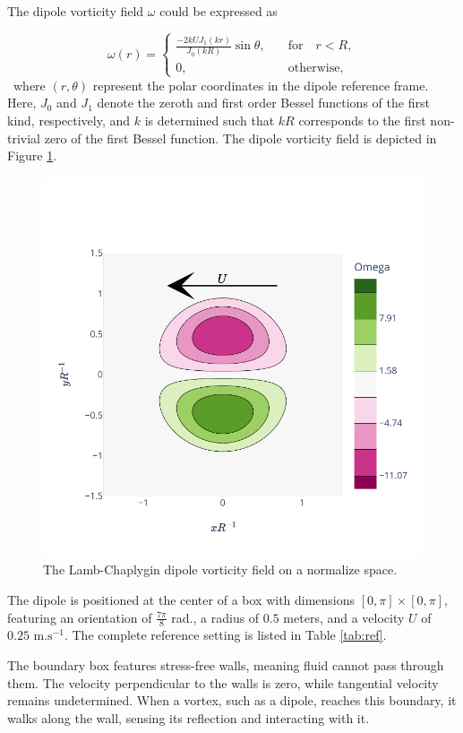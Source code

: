 The dipole vorticity field $\omega$ could be expressed as

\begin{equation*}
	\omega(r) = \begin{cases}
		\frac{-2 k U J_1(kr)}{J_0(kR)} \sin \theta, \quad & \text{for} \quad  r < R, \\
		0, \quad                                          & \text{otherwise},
	\end{cases}
\end{equation*}~where $(r, \theta)$ represent the polar coordinates in the dipole reference frame. Here, $J_0$ and $J_1$ denote the zeroth and first order Bessel functions of the first kind, respectively, and $k$ is determined such that $kR$ corresponds to the first non-trivial zero of the first Bessel function.  The dipole vorticity field is depicted in Figure \ref{fig:lamb_dipole}.

\begin{figure}[ht]
	\centering
	\includegraphics[width=0.6\linewidth]{images/app2d/lamb.pdf}
	\caption{The Lamb-Chaplygin dipole vorticity field on a normalize space.}
	\label{fig:lamb_dipole}
\end{figure}

The dipole is positioned at the center of a box with dimensions $[0, \pi] \times [0, \pi]$, featuring an orientation of $\frac{7\pi}{8}$ rad., a radius of $0.5$ meters, and a velocity $U$ of $0.25 \text{ m.s}^{-1}$. The complete reference setting is listed in Table \ref{tab:ref}.

The boundary box features stress-free walls, meaning fluid cannot pass through them. The velocity perpendicular to the walls is zero, while tangential velocity remains undetermined. When a vortex, such as a dipole, reaches this boundary, it walks along the wall, sensing its reflection and interacting with it.

